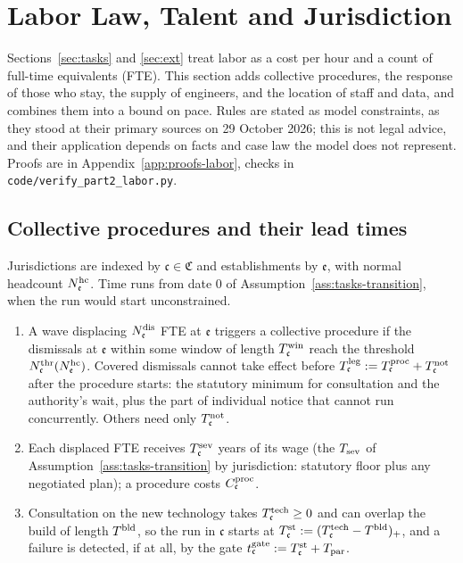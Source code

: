 \section{Labor Law, Talent and Jurisdiction}\label{sec:labor}

Sections~\ref{sec:tasks} and \ref{sec:ext} treat labor as a cost per hour and a count of full-time equivalents (FTE). This section adds collective procedures, the response of those who stay, the supply of engineers, and the location of staff and data, and combines them into a bound on pace. Rules are stated as model constraints, as they stood at their primary sources on 29 October 2026; this is not legal advice, and their application depends on facts and case law the model does not represent. Proofs are in Appendix~\ref{app:proofs-labor}, checks in \texttt{code/verify\_part2\_labor.py}.

\subsection{Collective procedures and their lead times}\label{sec:labor-proc}

\begin{assumption}\label{ass:labor-proc}
Jurisdictions are indexed by $\mathfrak c\in\mathfrak C$ and establishments by $\mathfrak e$, with normal headcount $N^{\rm hc}_{\mathfrak e}$. Time runs from date 0 of Assumption~\ref{ass:tasks-transition}, when the run would start unconstrained.
\begin{enumerate}
\item[(i)] A wave displacing $N^{\rm dis}_{\mathfrak e}$ FTE at $\mathfrak e$ triggers a collective procedure if the dismissals at $\mathfrak e$ within some window of length $T^{\rm win}_{\mathfrak c}$ reach the threshold $N^{\rm thr}_{\mathfrak c}(N^{\rm hc}_{\mathfrak e})$. Covered dismissals cannot take effect before $T^{\rm leg}_{\mathfrak c}:=T^{\rm proc}_{\mathfrak c}+T^{\rm not}_{\mathfrak c}$ after the procedure starts: the statutory minimum for consultation and the authority's wait, plus the part of individual notice that cannot run concurrently. Others need only $T^{\rm not}_{\mathfrak c}$.
\item[(ii)] Each displaced FTE receives $T^{\rm sev}_{\mathfrak c}$ years of its wage (the $T_{\rm sev}$ of Assumption~\ref{ass:tasks-transition} by jurisdiction: statutory floor plus any negotiated plan); a procedure costs $C^{\rm proc}_{\mathfrak c}$.
\item[(iii)] Consultation on the new technology takes $T^{\rm tech}_{\mathfrak c}\ge0$ and can overlap the build of length $T^{\rm bld}$, so the run in $\mathfrak c$ starts at $T^{\rm st}_{\mathfrak c}:=(T^{\rm tech}_{\mathfrak c}-T^{\rm bld})_+$, and a failure is detected, if at all, by the gate $t^{\rm gate}_{\mathfrak c}:=T^{\rm st}_{\mathfrak c}+T_{\rm par}$.
\end{enumerate}
\end{assumption}

